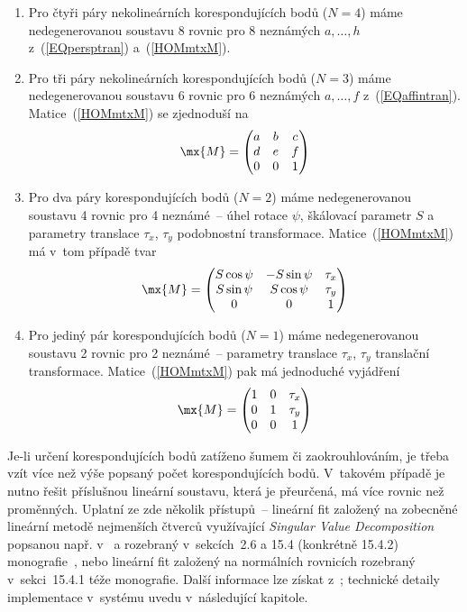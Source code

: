 \begin{enumerate}
\item Pro čtyři páry nekolineárních korespondujících bodů ($N=4$) máme
  nedegenerovanou soustavu 8 rovnic pro 8 neznámých $a,\ldots,h$
  z~(\ref{EQpersptran}) a~(\ref{HOMmtxM}).
\item Pro tři páry nekolineárních korespondujících bodů ($N=3$) máme
  nedegenerovanou soustavu 6 rovnic pro 6 neznámých $a,\ldots,f$
  z~(\ref{EQaffintran}). Matice~(\ref{HOMmtxM}) se zjednoduší na
\begin{equation}                                              \label{HOMmtxMAff}
  \mx{M} =
  \begin{pmatrix}
    a & b & c\\
    d & e & f\\
    0 & 0 & 1
  \end{pmatrix}
\end{equation}
\item\label{N2} Pro dva páry korespondujících bodů ($N=2$) máme
  nedegenerovanou soustavu 4 rovnic pro 4 neznámé~-- úhel rotace $\psi$,
  škálovací parametr $S$ a parametry translace $\tau_{x}$, $\tau_{y}$
  podobnostní transformace. Matice~(\ref{HOMmtxM}) má v~tom případě tvar
\begin{equation}                                              \label{HOMmtxMSim}
  \mx{M} =
  \begin{pmatrix}
    S\cos\psi & -S\sin\psi & \tau_{x}\\
    S\sin\psi & S\cos\psi & \tau_{y}\\
    0 & 0 & 1
  \end{pmatrix}
\end{equation}
\item\label{N1} Pro jediný pár korespondujících bodů ($N=1$) máme
  nedegenerovanou soustavu 2 rovnic pro 2 neznámé~-- parametry translace
  $\tau_{x}$, $\tau_{y}$ translační transformace. Matice~(\ref{HOMmtxM}) pak
  má jednoduché vyjádření
\begin{equation}                                              \label{HOMmtxMTra}
  \mx{M} =
  \begin{pmatrix}
    1 & 0 & \tau_{x}\\
    0 & 1 & \tau_{y}\\
    0 & 0 & 1
  \end{pmatrix}
\end{equation}
\end{enumerate}

Je-li určení korespondujících bodů zatíženo šumem či zaokrouhlováním, je třeba
vzít více než výše popsaný počet korespondujících bodů. V~takovém případě je
nutno řešit příslušnou lineární soustavu, která je přeurčená, má více rovnic
než proměnných. Uplatní ze zde několik přístupů~-- lineární fit založený na
zobecněné lineární metodě nejmenších čtverců využívající \emph{Singular Value
  Decomposition} popsanou např. v~\cite{Son-Hla-Boy:2007:ImPrAnMachVi:3} a
rozebraný v~sekcích~2.6 a 15.4 (konkrétně 15.4.2)
monografie~\cite{Pre-etal:2007:NumReCpp:CD-ROM}, nebo lineární fit založený na
normálních rovnicích rozebraný v~sekci~15.4.1 téže monografie. Další informace
lze získat z~\cite{AGo:2012:ImageReg:2012}; technické detaily implementace
v~systému \Mma{} uvedu v~následující kapitole.

